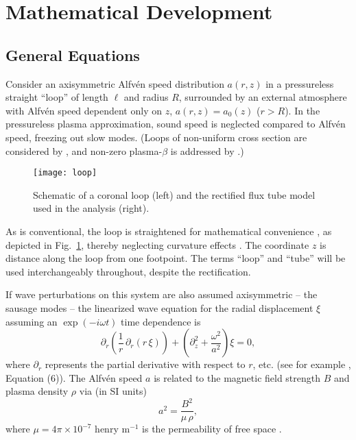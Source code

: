 \documentclass[12pt]{iopart}
\renewcommand{\L}{{\ell}}
\begin{document}
\section{Mathematical Development}
\subsection{General Equations}
Consider an axisymmetric Alfv\'en speed distribution $a(r,z)$ in a pressureless straight ``loop'' of length $\L$ and radius $R$, surrounded by an external atmosphere with Alfv\'en speed dependent only on $z$, $a(r,z)=a_0(z)$ ($r>R$). In the pressureless plasma approximation, sound speed is neglected compared to Alfv\'en speed, freezing out slow modes. (Loops of non-uniform cross section are considered by \cite{PasNakArb09aa}, and non-zero plasma-$\beta$ is addressed by \cite{CheLiXio16aa}.)

\begin{figure}[htbp]
\begin{center}
\texttt{[image: loop]}
\caption{ Schematic of a coronal loop (left) and the rectified flux tube model used in the analysis (right).}
\label{Fig:Loop}
\end{center}
\end{figure}

{ As is conventional, the loop is straightened for mathematical convenience \cite{RudRob02aa}, as depicted in Fig.~\ref{Fig:Loop}, thereby neglecting curvature effects \cite{SmiRobOli97aa,VanDebAnd04aa,VerFouNak06aa}. The coordinate $z$ is distance along the loop from one footpoint. The terms ``loop'' and ``tube'' will be used interchangeably throughout, despite the rectification.
}


If wave perturbations on this system are also assumed axisymmetric -- the sausage modes -- the linearized wave equation for the radial displacement $\xi$ assuming an $\exp(-i\omega t)$ time dependence is
\begin{equation}
\partial_r\left(\frac{1}{r}\,\partial_r\left(r\,\xi\right)\right)+\left(\partial_z^2+\frac{\omega^2}{a^2}\right)\xi=0,
\label{wave eqn}
\end{equation}
where $\partial_r$ represents the partial derivative with respect to $r$, etc. (see for example \cite{CheLiXio15aa}, Equation (6)). { The Alfv\'en speed $a$ is related to the magnetic field strength $B$ and plasma density $\rho$ via (in SI units)
\begin{equation}
a^2=\frac{B^2}{\mu\,\rho},
\end{equation}
where $\mu=4\pi\times 10^{-7}$ henry $\textrm{m}^{-1}$ is the permeability of free space \cite{Pri82aa}.}
\end{document}
